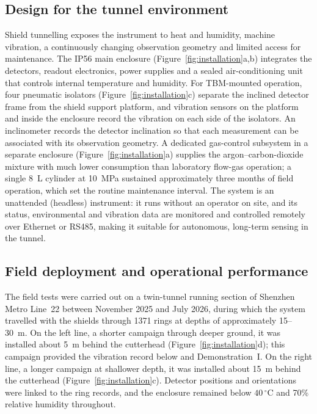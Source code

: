 \documentclass{WTC2027}
\begin{document}
\subsection{Design for the tunnel environment}
Shield tunnelling exposes the instrument to heat and humidity, machine vibration, a continuously changing observation geometry and limited access for maintenance. The IP56 main enclosure (Figure~\ref{fig:installation}a,b) integrates the detectors, readout electronics, power supplies and a sealed air-conditioning unit that controls internal temperature and humidity. For TBM-mounted operation, four pneumatic isolators (Figure~\ref{fig:installation}c) separate the inclined detector frame from the shield support platform, and vibration sensors on the platform and inside the enclosure record the vibration on each side of the isolators. An inclinometer records the detector inclination so that each measurement can be associated with its observation geometry. A dedicated gas-control subsystem in a separate enclosure (Figure~\ref{fig:installation}a) supplies the argon--carbon-dioxide mixture with much lower consumption than laboratory flow-gas operation; a single 8~L cylinder at 10~MPa sustained approximately three months of field operation, which set the routine maintenance interval. The system is an unattended (headless) instrument: it runs without an operator on site, and its status, environmental and vibration data are monitored and controlled remotely over Ethernet or RS485, making it suitable for autonomous, long-term sensing in the tunnel.

\subsection{Field deployment and operational performance}
The field tests were carried out on a twin-tunnel running section of Shenzhen Metro Line~22 between November 2025 and July 2026, during which the system travelled with the shields through 1371 rings at depths of approximately 15--30~m. On the left line, a shorter campaign through deeper ground, it was installed about 5~m behind the cutterhead (Figure~\ref{fig:installation}d); this campaign provided the vibration record below and Demonstration~I. On the right line, a longer campaign at shallower depth, it was installed about 15~m behind the cutterhead (Figure~\ref{fig:installation}c). Detector positions and orientations were linked to the ring records, and the enclosure remained below $40\,^{\circ}$C and 70\% relative humidity throughout.
\end{document}
